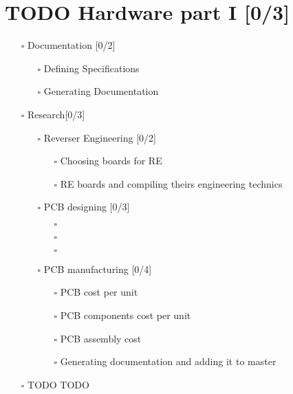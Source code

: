 \documentclass[11pt]{article}
\begin{document}
\section{{\bfseries\sffamily TODO} Hardware part I [0/3]}
\label{sec:orgc3f9416}
\begin{itemize}
\item[{$\square$}] Documentation [0/2]
\begin{itemize}
\item[{$\square$}] Defining Specifications
\item[{$\square$}] Generating Documentation
\end{itemize}
\item[{$\square$}] Research[0/3]
\begin{itemize}
\item[{$\square$}] Reverser Engineering [0/2]
\begin{itemize}
\item[{$\square$}] Choosing boards for RE
\item[{$\square$}] RE boards and compiling theirs engineering technics
\end{itemize}
\item[{$\square$}] PCB designing [0/3]
\begin{itemize}
\item[{$\square$}] 

\item[{$\square$}] 

\item[{$\square$}] 
\end{itemize}
\item[{$\square$}] PCB manufacturing [0/4]
\begin{itemize}
\item[{$\square$}] PCB cost per unit
\item[{$\square$}] PCB components cost per unit
\item[{$\square$}] PCB assembly cost
\item[{$\square$}] Generating documentation and adding it to master
\end{itemize}
\end{itemize}
\item[{$\square$}] TODO TODO
\end{itemize}
\end{document}
